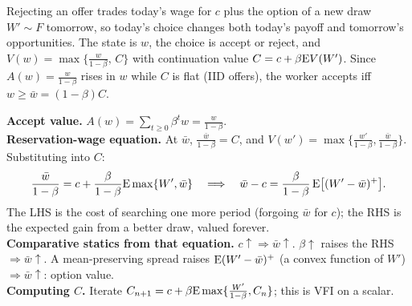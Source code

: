 \documentclass[11pt]{article}
\begin{document}
\begin{resp}
\begin{minipage}[t]{0.62\textwidth}\vspace{0pt}
Rejecting an offer trades today's wage for $c$ plus the option of a new draw $W'\sim F$ tomorrow, so today's choice changes both today's payoff and tomorrow's opportunities. The state is $w$, the choice is accept or reject, and $V(w)=\max\{\frac{w}{1-\beta},\,C\}$ with continuation value $C=c+\beta\mathrm{E} V(W')$. Since $A(w)=\frac{w}{1-\beta}$ rises in $w$ while $C$ is flat (IID offers), the worker accepts iff $w\ge\bar w=(1-\beta)C$.
\end{minipage}\hfill
\begin{minipage}[t]{0.34\textwidth}\vspace{0pt}\centering
\scalebox{0.75}{\figMcCall}
\end{minipage}
\end{resp}
\begin{intu}
\textbf{Accept value.} $A(w)=\sum_{t\ge0}\beta^tw=\frac{w}{1-\beta}$.\\
\textbf{Reservation-wage equation.} At $\bar w$, $\frac{\bar w}{1-\beta}=C$, and $V(w')=\max\{\frac{w'}{1-\beta},\frac{\bar w}{1-\beta}\}$. Substituting into $C$:
\[\frac{\bar w}{1-\beta}=c+\frac{\beta}{1-\beta}\mathrm{E}\max\{W',\bar w\}\quad\Longrightarrow\quad \bar w-c=\frac{\beta}{1-\beta}\,\mathrm{E}\big[(W'-\bar w)^+\big].\]
The LHS is the cost of searching one more period (forgoing $\bar w$ for $c$); the RHS is the expected gain from a better draw, valued forever.\\
\textbf{Comparative statics from that equation.} $c\uparrow\Rightarrow\bar w\uparrow$. $\beta\uparrow$ raises the RHS $\Rightarrow\bar w\uparrow$. A mean-preserving spread raises $\mathrm{E}(W'-\bar w)^+$ (a convex function of $W'$) $\Rightarrow\bar w\uparrow$: option value.\\
\textbf{Computing $C$.} Iterate $C_{n+1}=c+\beta\mathrm{E}\max\{\frac{W'}{1-\beta},C_n\}$; this is VFI on a scalar.
\end{intu}
\end{document}
